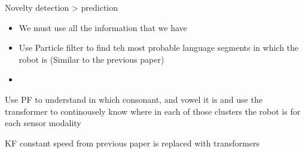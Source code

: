 \begin{frame}{Novelty detection > prediction}
    \begin{itemize}
        \item We must use all the information that we have
        \item Use Particle filter to find teh most probable language segments in which the robot is (Similar to the previous paper)
        \item
    \end{itemize}
    
    Use PF to understand in which consonant, and vowel it is and use the transformer to continousely know where in each of those clusters the robot is for each sensor modality
    
    KF constant speed from previous paper is replaced with transformers
\end{frame}